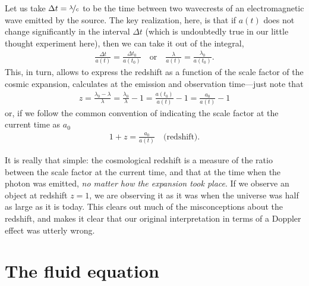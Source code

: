 Let us take $\Delta t = \nicefrac{\lambda}{c}$ to be the time between two wavecrests
of an electromagnetic wave emitted by the source. The key realization, here, is that
if $a(t)$ does not change significantly in the interval $\Delta t$ (which is undoubtedly
true in our little thought experiment here), then we can take it out of the integral,
\begin{align*}
  \frac{\Delta t}{a(t)} = \frac{\Delta t_0}{a(t_0)}
  \quad\text{or}\quad
  \frac{\lambda}{a(t)} = \frac{\lambda_0}{a(t_0)}.
\end{align*}
This, in turn, allows to express the redshift as a function of the scale factor
of the cosmic expansion, calculates at the emission and observation time---just note
that
\begin{align*}
  z = \frac{\lambda_0 - \lambda}{\lambda} = \frac{\lambda_0}{\lambda} - 1 =
  \frac{a(t_0)}{a(t)} - 1 = \frac{a_0}{a(t)} - 1
\end{align*}
or, if we follow the common convention of indicating the scale factor at the current
time as $a_0$
\begin{align}\label{eq:reshift}
  1 + z = \frac{a_0}{a(t)} \quad\text{(redshift)}.
\end{align}

It is really that simple: the cosmological redshift is a measure of the ratio between
the scale factor at the current time, and that at the time when the photon
was emitted, \emph{no matter how the expansion took place}. If we observe an object
at redshift $z = 1$, we are observing it as it was when the universe was half as
large as it is today. This clears out much of the misconceptions about the redshift, and
makes it clear that our original interpretation in terms of a Doppler
effect
was utterly wrong.



\section{The fluid equation}

